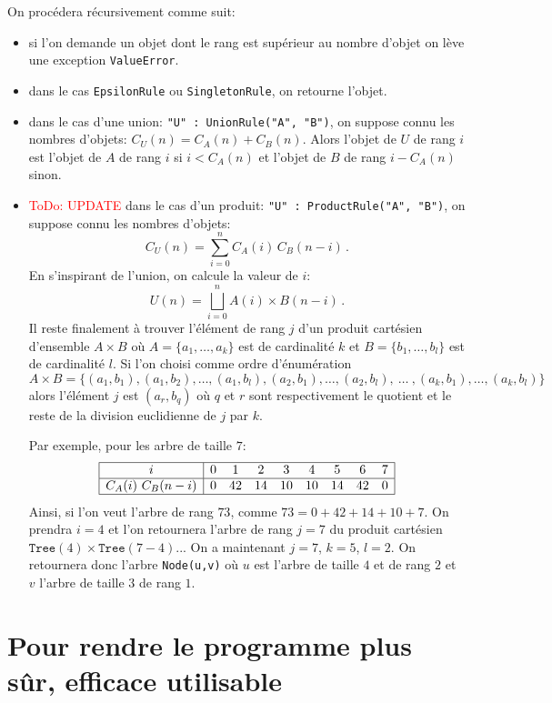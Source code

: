 \documentclass[11pt]{article}
\newcommand\todo[1]{\textcolor{red}{ToDo: #1}}
\begin{document}
On procédera récursivement comme suit:
\begin{itemize}
\item si l'on demande un objet dont le rang est supérieur au nombre d'objet on
  lève une exception \texttt{ValueError}.
\item dans le cas \texttt{EpsilonRule} ou \texttt{SingletonRule}, on retourne
  l'objet.
\item dans le cas d'une union: \texttt{"U" : UnionRule("A", "B")}, on suppose
  connu les nombres d'objets: $C_U(n) = C_A(n) + C_B(n)$. Alors l'objet de $U$
  de rang $i$ est l'objet de $A$ de rang $i$ si $i<C_A(n)$ et l'objet de $B$
  de rang $i-C_A(n)$ sinon.
\item \todo{UPDATE} dans le cas d'un produit: \texttt{"U" : ProductRule("A", "B")}, on suppose
  connu les nombres d'objets:
  $$
  C_U(n) = \sum_{i=0}^n C_A(i)\,C_B(n-i)\,.
  $$
  En s'inspirant de l'union, on calcule la valeur de $i$:
  $$
  U(n) = \bigsqcup_{i=0}^n A(i) \times B(n-i)\,.
  $$
  Il reste finalement à trouver l'élément de rang $j$ d'un produit cartésien
  d'ensemble $A\times B$ où $A=\{a_1,\dots,a_k\}$ est de cardinalité $k$ et
  $B=\{b_1,\dots,b_l\}$ est de cardinalité $l$. Si l'on choisi comme ordre
  d'énumération
  $$
  A\times B =\{(a_1, b_1), (a_1, b_2), \dots, (a_1, b_l),
               (a_2, b_1), \dots, (a_2, b_l),
               \ \dots\ ,
               (a_k, b_1), \dots, (a_k, b_l)\}
  $$
  alors l'élément $j$ est $(a_{r}, b_{q})$ où $q$ et $r$ sont respectivement
  le quotient et le reste de la division euclidienne de $j$ par $k$.

  Par exemple, pour les arbre de taille $7$:
  $$
  \begin{array}{|c|cccccccc|}
    \hline
    i           & 0&  1&  2&  3&  4&  5&  6& 7\\
    \hline
    C_A(i)\ C_B(n-i)  & 0& 42& 14& 10& 10& 14& 42& 0\\
    \hline
  \end{array}
  $$
  Ainsi, si l'on veut l'arbre de rang $73$, comme $73 = 0+42+14+10+7$. On
  prendra $i=4$ et l'on retournera l'arbre de rang $j=7$ du produit cartésien
  $\texttt{Tree}(4) \times \texttt{Tree}(7-4)$...  On a maintenant $j=7$,
  $k=5$, $l=2$. On retournera donc l'arbre \texttt{Node(u,v)} où $u$ est
  l'arbre de taille $4$ et de rang $2$ et $v$ l'arbre de taille $3$ de rang
  $1$.
\end{itemize}

\section{Pour rendre le programme plus sûr, efficace utilisable}
\end{document}
